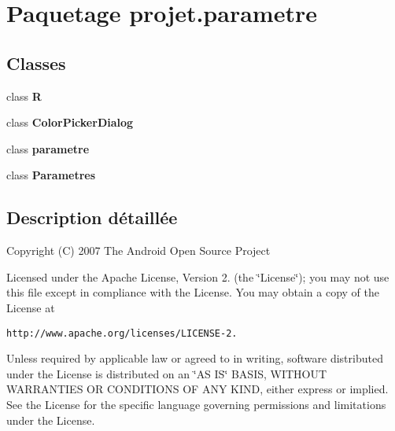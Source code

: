 \section{\-Paquetage projet.\-parametre}
\label{namespaceprojet_1_1parametre}
\subsection*{\-Classes}
\begin{DoxyCompactItemize}
\item 
class {\bf \-R}
\item 
class {\bf \-Color\-Picker\-Dialog}
\item 
class {\bf parametre}
\item 
class {\bf \-Parametres}
\end{DoxyCompactItemize}


\subsection{\-Description détaillée}
\-Copyright (\-C) 2007 \-The \-Android \-Open \-Source \-Project

\-Licensed under the \-Apache \-License, \-Version 2. (the \char`\"{}\-License\char`\"{}); you may not use this file except in compliance with the \-License. \-You may obtain a copy of the \-License at

{\tt http\-://www.\-apache.\-org/licenses/\-L\-I\-C\-E\-N\-S\-E-\/2.}

\-Unless required by applicable law or agreed to in writing, software distributed under the \-License is distributed on an \char`\"{}\-A\-S I\-S\char`\"{} \-B\-A\-S\-I\-S, \-W\-I\-T\-H\-O\-U\-T \-W\-A\-R\-R\-A\-N\-T\-I\-E\-S \-O\-R \-C\-O\-N\-D\-I\-T\-I\-O\-N\-S \-O\-F \-A\-N\-Y \-K\-I\-N\-D, either express or implied. \-See the \-License for the specific language governing permissions and limitations under the \-License. 